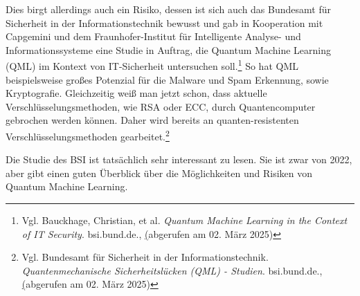 Dies birgt allerdings auch ein Risiko, dessen ist sich auch das Bundesamt für Sicherheit in der Informationstechnik bewusst und gab in Kooperation mit Capgemini und dem Fraunhofer-Institut für Intelligente Analyse- und Informationssysteme eine Studie in Auftrag, die Quantum Machine Learning (QML) im Kontext von IT-Sicherheit untersuchen soll.\footnote{Vgl. Bauckhage, Christian, et al. \textit{Quantum Machine Learning in the Context of IT Security}. bsi.bund.de., \href{https://www.bsi.bund.de/SharedDocs/Downloads/DE/BSI/Publikationen/Studien/QML/QML_in_the_Context_of_IT_Security.pdf} (abgerufen am 02. März 2025)}
So hat QML beispielsweise großes Potenzial für die Malware und Spam Erkennung, sowie Kryptografie.
Gleichzeitig weiß man jetzt schon, dass aktuelle Verschlüsselungsmethoden, wie RSA oder ECC, durch Quantencomputer gebrochen werden können.
Daher wird bereits an quanten-resistenten Verschlüsselungsmethoden gearbeitet.\footnote{Vgl. Bundesamt für Sicherheit in der Informationstechnik. \textit{Quantenmechanische Sicherheitslücken (QML) - Studien}. bsi.bund.de., \href{https://www.bsi.bund.de/DE/Service-Navi/Publikationen/Studien/QML/QML_node.html} (abgerufen am 02. März 2025)}\\

\begin{tcolorbox}[title=Kommentar,
    title filled=false,
    colback=cyan!5!white,
    colframe=cyan!75!black]
    Die Studie des BSI ist tatsächlich sehr interessant zu lesen.
    Sie ist zwar von 2022, aber gibt einen guten Überblick über die Möglichkeiten und Risiken von Quantum Machine Learning.
\end{tcolorbox}

